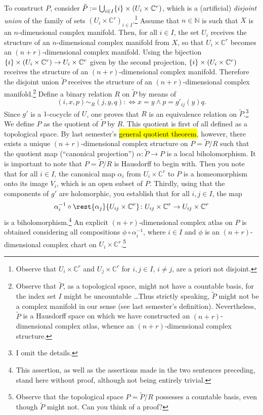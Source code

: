 \documentclass[a4paper]{amsart}
\newcommand{\N}{\mathbb{N}}
\newcommand{\C}{\mathbb{C}}
\theoremstyle{remark}
\numberwithin{equation}{question}
\DeclarePairedDelimiter\set{\{}{\}}
\begin{document}
\begin{solution}
\begin{solenum}
To construct $P$, consider $\tilde P := \bigcup_{i \in I} \set i \times (U_i \times \C^r)$, which is a (artificial) \emph{disjoint union} of the family of sets $(U_i \times \C^r)_{i \in I}$.\footnote{Observe that $U_i \times \C^r$ and $U_j \times \C^r$ for $i,j \in I$, $i \ne j$, are a priori not disjoint.} Assume that $n \in \N$ is such that $X$ is an $n$-dimensional complex manifold. Then, for all $i \in I$, the set $U_i$ receives the structure of an $n$-dimensional complex manifold from $X$, so that $U_i \times \C^r$ becomes an $(n+r)$-dimensional complex manifold. Using the bijection $\set i \times (U_i \times \C^r) \to U_i \times \C^r$ given by the second projection, $\set i \times (U_i \times \C^r)$ receives the structure of an $(n+r)$-dimensional complex manifold. Therefore the disjoint union $\tilde P$ receives the structure of an $(n+r)$-dimensional complex manifold.\footnote{Observe that $\tilde P$, as a topological space, might not have a countable basis, for the index set $I$ might be uncountable \ldots Thus strictly speaking, $\tilde P$ might not be a complex manifold in our sense (see last semester's definition). Nevertheless, $\tilde P$ is a Hausdorff space on which we have constructed an $(n+r)$-dimensional complex atlas, whence an $(n+r)$-dimensional complex structure.} Define a binary relation $R$ on $\tilde P$ by means of
\[
(i,x,p) \sim_R (j,y,q) :\iff x=y \land p = g'_{ij}(y)q.
\]
Since $g'$ is a $1$-cocycle of $U$, one proves that $R$ is an equivalence relation on $\tilde P$.\footnote{I omit the details.} We define $P$ as the quotient of $\tilde P$ by $R$. This quotient is first of all defined as a topological space. By last semester's \hl{general quotient theorem}, however, there exists a unique $(n+r)$-dimensional complex structure on $P = \tilde P/R$ such that the quotient map (“canonical projection”) $\alpha \colon \tilde P \to P$ is a local biholomorphism. It is important to note that $P = \tilde P/R$ is Hausdorff to begin with. Then you note that for all $i \in I$, the canonical map $\alpha_i$ from $U_i \times \C^r$ to $P$ is a homeomorphism onto its image $V_i$, which is an open subset of $P$. Thirdly, using that the components of $g'$ are holomorphic, you establish that for all $i,j \in I$, the map
\[
\alpha_i^{-1} \circ \rest{\alpha_j}{U_{ij} \times \C^r} \colon U_{ij} \times \C^r \to U_{ij} \times \C^r
\]
is a biholomorphism.\footnote{This assertion, as well as the assertions made in the two sentences preceding, stand here without proof, although not being entirely trivial.} An explicit $(n+r)$-dimensional complex atlas on $P$ is obtained considering all compositions $\phi \circ \alpha_i^{-1}$, where $i \in I$ and $\phi$ is an $(n+r)$-dimensional complex chart on $U_i \times \C^r$.\footnote{Observe that the topological space $P = \tilde P/R$ possesses a countable basis, even though $\tilde P$ might not. Can you think of a proof?}


\end{solenum}
\end{solution}
\end{document}

